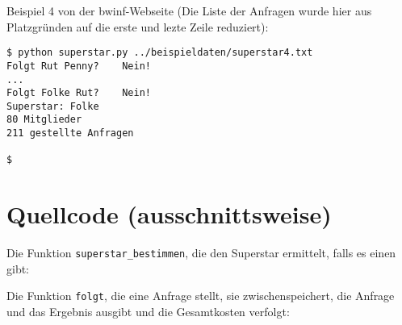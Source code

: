 \documentclass[a4paper,10pt,ngerman]{scrartcl}
\begin{document}
Beispiel 4 von der bwinf-Webseite (Die Liste der Anfragen wurde hier 
aus Platzgründen auf die erste und lezte Zeile reduziert):
\begin{lstlisting}
$ python superstar.py ../beispieldaten/superstar4.txt
Folgt Rut Penny? 	Nein!
...
Folgt Folke Rut? 	Nein!
Superstar: Folke
80 Mitglieder
211 gestellte Anfragen

$
\end{lstlisting}

\clearpage

\section{Quellcode (ausschnittsweise)}

Die Funktion \texttt{superstar\_bestimmen}, die den Superstar ermittelt,
falls es einen gibt:


\vspace{30pt}

Die Funktion \texttt{folgt}, die eine Anfrage stellt, sie zwischenspeichert,
die Anfrage und das Ergebnis ausgibt und die Gesamtkosten verfolgt:

\end{document}
